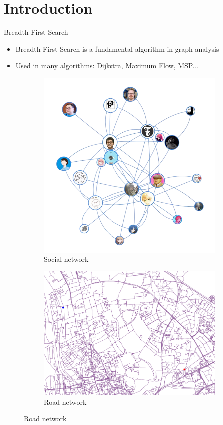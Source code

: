 \section{Introduction}

\begin{frame}{Breadth-First Search}
    \begin{itemize}
        \item Breadth-First Search is a fundamental algorithm in graph analysis
        \item Used in many algorithms: Dijkstra, Maximum Flow, MSP...
    \end{itemize}
    \begin{figure}
        \centering
        \begin{subfigure}[b]{0.32\textwidth}
            \centering
            \includegraphics[width=0.8\linewidth]{images/Collaboration network.png}
            \caption{Social network}
        \end{subfigure}
        \begin{subfigure}[b]{0.32\textwidth}
            \centering
            \includegraphics[width=1.05\linewidth]{images/roadnet.png}
            \caption{Road network}
        \end{subfigure}
    \end{figure}
\end{frame}

